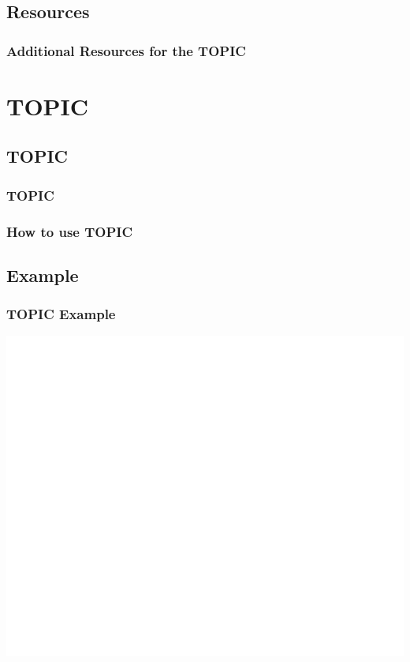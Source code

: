 \documentclass{beamer}
\begin{document}
\subsection{Resources}		
\begin{frame}
	\frametitle{Additional Resources for the TOPIC}
	\begin{outline}
		\1 
		\2 
		\2
	\end{outline}
\end{frame}

		
\section{TOPIC}

\subsection{TOPIC}		

\begin{frame}
	\frametitle{TOPIC}
	\begin{outline}
		\1 
	\end{outline}
\end{frame}

\begin{frame}
	\frametitle{How to use TOPIC}
	\begin{outline}
		\1 
	\end{outline}
\end{frame}

\subsection{Example}		
\begin{frame}
	\frametitle{TOPIC Example}
	\begin{center}
		\includegraphics[width=1.0\textwidth]{images/TOPIC example.png}
	\end{center}
\end{frame}
\end{document}
